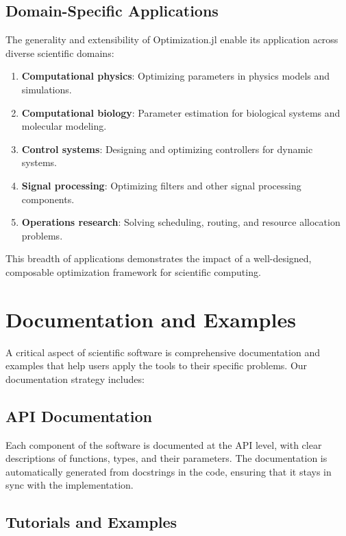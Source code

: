 \subsection{Domain-Specific Applications}

The generality and extensibility of Optimization.jl enable its application across diverse scientific domains:

\begin{enumerate}
\item \textbf{Computational physics}: Optimizing parameters in physics models and simulations.

\item \textbf{Computational biology}: Parameter estimation for biological systems and molecular modeling.

\item \textbf{Control systems}: Designing and optimizing controllers for dynamic systems.

\item \textbf{Signal processing}: Optimizing filters and other signal processing components.

\item \textbf{Operations research}: Solving scheduling, routing, and resource allocation problems.
\end{enumerate}

This breadth of applications demonstrates the impact of a well-designed, composable optimization framework for scientific computing.

\section{Documentation and Examples}

A critical aspect of scientific software is comprehensive documentation and examples that help users apply the tools to their specific problems. Our documentation strategy includes:

\subsection{API Documentation}

Each component of the software is documented at the API level, with clear descriptions of functions, types, and their parameters. The documentation is automatically generated from docstrings in the code, ensuring that it stays in sync with the implementation.

\subsection{Tutorials and Examples}

